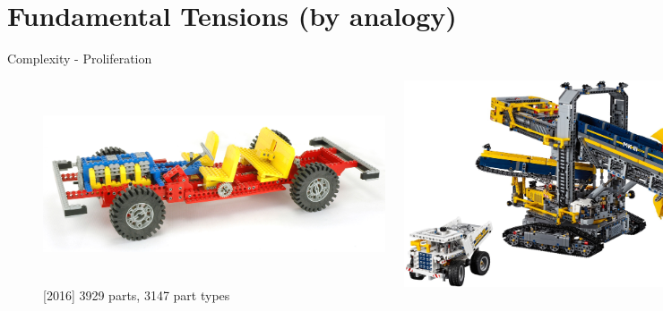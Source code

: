 \documentclass[xcolor=dvipsnames]{beamer}
\begin{document}
\section{Fundamental Tensions (by analogy)}


\begin{frame}{Complexity - Proliferation}
\begin{figure}
  \centering
  \begin{columns}
    \centering
    \caption {[1977] 601 parts, 99 part types}
    \includegraphics[width=0.9\textwidth]{1977_853_car}
    \centering
    \caption {[2016] 3929 parts, 3147 part types}
    \includegraphics[width=0.9\textwidth]{2016_42055_excavator}
  \end{columns}
\end{figure}
\end{frame}
\end{document}
